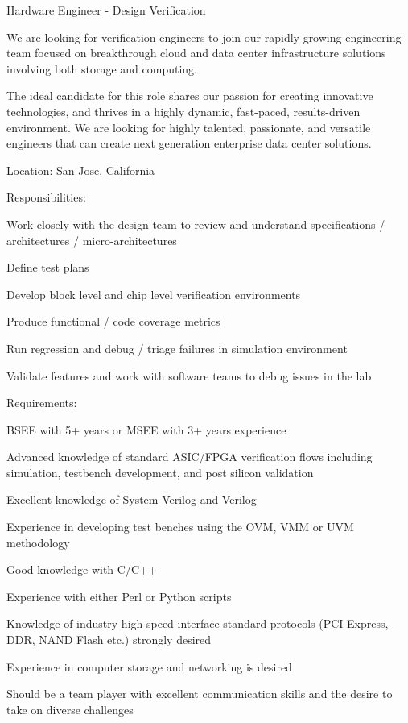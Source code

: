 \break

\par Hardware Engineer - Design Verification
\par We are looking for verification engineers to join our rapidly growing engineering team focused on breakthrough cloud and data center infrastructure solutions involving both storage and computing.
\par The ideal candidate for this role shares our passion for creating innovative technologies, and thrives in a highly dynamic, fast-paced, results-driven environment. We are looking for highly talented, passionate, and versatile engineers that can create next generation enterprise data center solutions.
\par Location: San Jose, California
\par Responsibilities:
\par Work closely with the design team to review and understand specifications / architectures / micro-architectures
\par Define test plans
\par Develop block level and chip level verification environments
\par Produce functional / code coverage metrics
\par Run regression and debug / triage failures in simulation environment
\par Validate features and work with software teams to debug issues in the lab
\par Requirements:
\par BSEE with 5+ years or MSEE with 3+ years experience
\par Advanced knowledge of standard ASIC/FPGA verification flows including simulation, testbench development, and post silicon validation
\par Excellent knowledge of System Verilog and Verilog
\par Experience in developing test benches using the OVM, VMM or UVM methodology
\par Good knowledge with C/C++
\par Experience with either Perl or Python scripts
\par Knowledge of industry high speed interface standard protocols (PCI Express, DDR, NAND Flash etc.) strongly desired
\par Experience in computer storage and networking is desired
\par Should be a team player with excellent communication skills and the desire to take on diverse challenges

